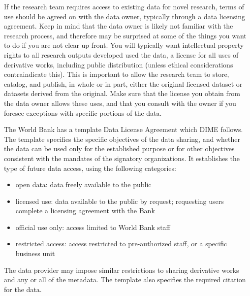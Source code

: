 If the research team requires access to existing data for novel research,
terms of use should be agreed on with the data owner, 
typically through a data licensing agreement.
Keep in mind that the data owner is likely not familiar
with the research process, and therefore may be surprised
at some of the things you want to do if you are not clear up front.
You will typically want intellectual property rights to all research outputs developed used the data,
a license for all uses of derivative works, including public distribution 
(unless ethical considerations contraindicate this).
This is important to allow the research team to store, catalog, and publish, in whole or in part,
either the original licensed dataset or datasets derived from the original.
Make sure that the license you obtain from the data owner allows these uses,
and that you consult with the owner if you foresee exceptions with specific portions of the data.

The World Bank has a template Data License Agreement which DIME follows.
The template specifies the specific objectives of the data sharing, 
and whether the data can be used only for the established purpose or for other objectives 
consistent with the mandates of the signatory organizations. 
It establishes the type of future data access, using the following categories:
\begin{itemize}	
	\item{open data: data freely available to the public}
	\item{licensed use: data available to the public by request; requesting users complete a licensing agreement with the Bank}
	\item{official use only: access limited to World Bank staff}
	\item{restricted access: access restricted to pre-authorized staff, or a specific business unit}
\end{itemize}
The data provider may impose similar restrictions to sharing derivative works and any or all of the metadata. 
The template also specifies the required citation for the data. 


